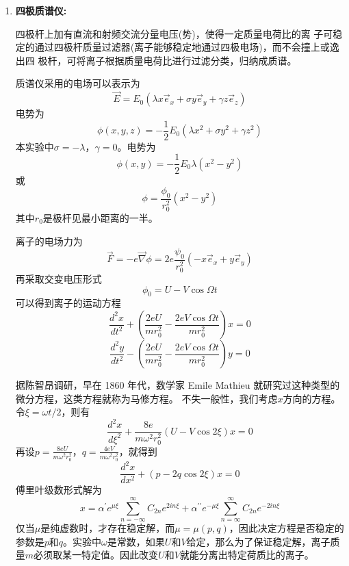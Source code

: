 \documentclass[11pt,a4paper]{ctexart}
\newcommand{\beq}{\begin{equation}}
\newcommand{\eeq}{\end{equation}}
\begin{document}
\begin{enumerate}
\item \textbf{四极质谱仪:}\par
四极杆上加有直流和射频交流分量电压(势)，使得一定质量电荷比的离 子可稳定的通过四极杆质量过滤器(离子能够稳定地通过四极电场)，而不会撞上或逸出四 极杆，可将离子根据质量电荷比进行过滤分类，归纳成质谱。\par
质谱仪采用的电场可以表示为
\beq
\vec{E} = E_0 (\lambda x \vec{e}_x + \sigma y \vec{e}_y + \gamma z \vec{e}_z )
\eeq
电势为
\beq
\phi(x,y,z) = -\frac{1}{2} E_0 ( \lambda x^2 + \sigma y^2 + \gamma z^2 )
\eeq
本实验中$\sigma = -\lambda$，$\gamma = 0$。电势为
\beq
\phi(x,y) = -\frac{1}{2} E_0 \lambda (x^2 - y^2)
\eeq
或
\beq
\phi = \frac{\phi_0}{r_0^2} (x^2 - y^2)
\eeq
其中$r_0$是极杆见最小距离的一半。\par
离子的电场力为
\beq
\vec{F} = -e \vec{\nabla} \phi = 2e \frac{\psi_0}{r_0^2}  (-x\vec{e}_x + y \vec{e}_y )
\eeq
再采取交变电压形式
\beq
\phi_0 = U - V \cos \varOmega t
\eeq
可以得到离子的运动方程
\beq
\frac{d^{2} x}{d t^{2}}+\left(\frac{2 e U}{m r_{0}^{2}}-\frac{2 e V \cos \Omega t}{m r_{0}^{2}}\right) x=0
\eeq
\beq
\frac{d^{2} y}{d t^{2}}-\left(\frac{2 e U}{m r_{0}^{2}}-\frac{2 e V \cos \Omega t}{m r_{0}^{2}}\right) y=0
\eeq
\par
据陈智昂调研，早在 1860 年代，数学家 Emile Mathieu 就研究过这种类型的微分方程\cite{att4}，这类方程就称为马修方程。 不失一般性，我们考虑$x$方向的方程。令$\xi = \omega t / 2$，则有
\beq
\frac{d^{2} x}{d \xi^{2}}+\frac{8 e}{m \omega^{2} r_{0}^{2}}(U - V \cos 2 \xi) x=0
\eeq
再设$p = \frac{8eU}{m\omega^2 r_0^2}$，$q = \frac{4eV}{m\omega^2 r_0^2}$，就得到
\beq
\frac{d^{2} x}{d x^{2}}+(p-2 q \cos 2 \xi) x=0
\eeq
傅里叶级数形式解为
\beq
x=\alpha^{\prime} e^{\mu \xi} \sum_{n=-\infty}^{\infty} C_{2 n} e^{2 i n \xi}+\alpha^{\prime \prime} e^{-\mu \xi} \sum_{n=\infty}^{\infty} C_{2 n} e^{-2 i n \xi}
\eeq
仅当$\mu$是纯虚数时，才存在稳定解，而$\mu = \mu (p,q)$，因此决定方程是否稳定的参数是$p$和$q$。实验中$\omega$是常数，如果$U$和$V$给定，那么为了保证稳定解，离子质量$m$必须取某一特定值。因此改变$U$和$V$就能分离出特定荷质比的离子。

\end{enumerate}
\end{document}
